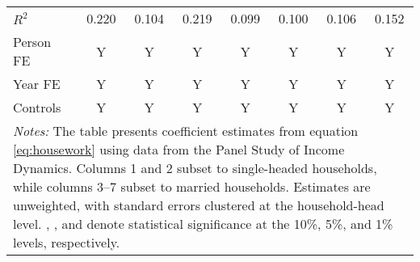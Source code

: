 {\begin{tabular}{l*{7}{c}}
\(R^{2}\)           &       0.220         &       0.104         &       0.219         &       0.099         &       0.100         &       0.106         &       0.152         \\
Person FE           &           Y         &           Y         &           Y         &           Y         &           Y         &           Y         &           Y         \\
Year FE             &           Y         &           Y         &           Y         &           Y         &           Y         &           Y         &           Y         \\
Controls            &           Y         &           Y         &           Y         &           Y         &           Y         &           Y         &           Y         \\
\bottomrule
\multicolumn{8}{p{16cm}}{\footnotesize \textit{Notes:} The table presents coefficient estimates from equation \ref{eq:housework} using data from the Panel Study of Income Dynamics. Columns 1 and 2 subset to single-headed households, while columns 3--7 subset to married households. Estimates are unweighted, with standard errors clustered at the household-head level. \sym{*}, \sym{**}, and \sym{***} denote statistical significance at the 10\%, 5\%, and 1\% levels, respectively.}\\
\end{tabular}
}
